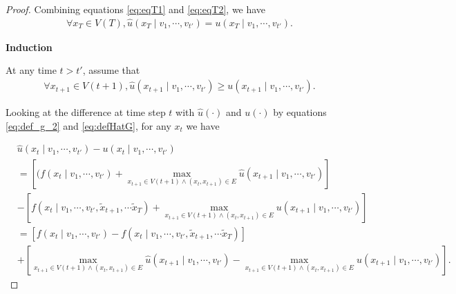 \documentclass[12pt]{article}
\begin{document}
\begin{lem}
\begin{proof}
Combining equations \eqref{eq:eqT1} and \eqref{eq:eqT2}, we have
\begin{equation}
\label{eq:inductionInit}
\begin{aligned}
\forall x_{T} \in V(T), \hat{u}( x_{T} \mid v_{1} , \cdots , v_{t'} ) = u( x_{T} \mid v_{1} , \cdots , v_{t'} ).
\end{aligned}
\end{equation}

\textbf{Induction}

At any time $ t > t' $, assume that
\begin{equation}
\label{eq:inductionAssumption}
\begin{aligned}
\forall x_{t+1} \in V(t+1), \hat{u}(x_{t+1} \mid v_{1} , \cdots , v_{t'} ) \geq u(x_{t+1} \mid v_{1} , \cdots , v_{t'} ).
\end{aligned}
\end{equation}

Looking at the difference at time step $ t $ with  $ \hat{u}(\cdot) $ and $ u(\cdot) $ by equations \eqref{eq:def_g_2} and \eqref{eq:defHatG}, for any $ x_{t} $ we have

\begin{equation}
\label{eq:extendDifference}
\begin{aligned}
& \hat{u}( x_{t} \mid v_{1} , \cdots , v_{t'} ) - u(x_{t} \mid v_{1} , \cdots , v_{t'} ) \\
& = \left[( f( x_{t} \mid v_{1} , \cdots , v_{t'} ) + \max_{x_{t+1} \in V(t+1) \land (x_{t}, x_{t+1}) \in E } \hat{u}( x_{t+1} \mid v_{1} , \cdots , v_{t'} ) \right]  \\
& - \left[  f( x_{t} \mid v_{1} , \cdots , v_{t'}, \tilde{x}_{t+1}, \cdots \tilde{x}_{T} ) +  \max_{x_{t+1} \in V(t+1) \land ( x_{t}, x_{t+1} ) \in E } u( x_{t+1} \mid v_{1} , \cdots , v_{t'} ) \right]  \\
& = \left[ f(x_{t} \mid v_{1} , \cdots , v_{t'} ) - f(x_{t} \mid v_{1} , \cdots , v_{t'}, \tilde{x}_{t+1}, \cdots \tilde{x}_{T} ) \right] \\
& + \left[ \max_{ x_{t+1} \in V(t+1) \land ( x_{t}, x_{t+1} ) \in E } \hat{u}( x_{t+1} \mid v_{1} , \cdots , v_{t'} ) - \max_{x_{t+1} \in V(t+1) \land ( x_{t}, x_{t+1} ) \in E } u( x_{t+1} \mid v_{1} , \cdots , v_{t'} ) \right] .
\end{aligned}
\end{equation}


\end{proof}
\end{lem}
\end{document}
